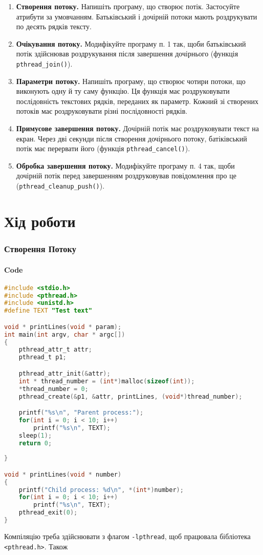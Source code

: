\documentclass{article}
\begin{document}
 
 \tableofcontents
 \newpage
\large
\begin{enumerate}
	\item \textbf{Створення потоку.} Напишіть програму, що створює потік. Застосуйте
	атрибути за умовчанням. Батьківський і дочірній потоки мають
	роздрукувати по десять рядків тексту.
	\item \textbf{Очікування потоку.} Модифікуйте програму п. 1 так, щоби
	батьківський потік здійснював роздрукування після завершення
	дочірнього (функція \texttt{pthread\_join()}).
	\item \textbf{Параметри потоку.} Напишіть програму, що створює чотири потоки,
	що виконують одну й ту саму функцію. Ця функція має роздруковувати
	послідовність текстових рядків, переданих як параметр. Кожний
	зі створених потоків має роздруковувати різні послідовності рядків.
	\item \textbf{Примусове завершення потоку.} Дочірній потік має роздруковувати
	текст на екран. Через дві секунди після створення дочірнього потоку,
	батіківський потік має перервати його (функція \texttt{pthread\_cancel()}).
	\item \textbf{Обробка завершення потоку.} Модифікуйте програму п. 4 так, щоби
	дочірній потік перед завершенням роздруковував повідомлення про це
	(\texttt{pthread\_cleanup\_push()}).
\end{enumerate}
\newpage
\part*{Хід роботи}
\section{Створення Потоку}
\subsection{Code}\vspace{-3mm}
\begin{lstlisting}[language=C]
#include <stdio.h>
#include <pthread.h>
#include <unistd.h>
#define TEXT "Test text"

void * printLines(void * param);
int main(int argv, char * argc[])
{
    pthread_attr_t attr;
    pthread_t p1;

    pthread_attr_init(&attr);
    int * thread_number = (int*)malloc(sizeof(int));
    *thread_number = 0;
    pthread_create(&p1, &attr, printLines, (void*)thread_number);

    printf("%s\n", "Parent process:");
    for(int i = 0; i < 10; i++)
        printf("%s\n", TEXT);
    sleep(1);
    return 0;
    
}

void * printLines(void * number)
{
    printf("Child process: %d\n", *(int*)number);
    for(int i = 0; i < 10; i++)
        printf("%s\n", TEXT);
    pthread_exit(0);
}
\end{lstlisting}
Компіляцію треба здійснювати з флагом \texttt{-lpthread}, щоб працювала бібліотека \linebreak\texttt{<pthread.h>}. Також
\end{document}
